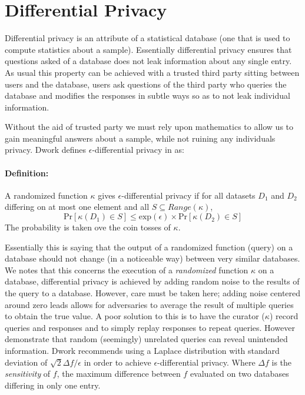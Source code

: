 \section{Differential Privacy}\label{sec:diff}
Differential privacy is an attribute of a statistical database (one that is used
to compute statistics about a sample). Essentially differential privacy ensures
that questions asked of a database does not leak information about any single
entry. As usual this property can be achieved with a trusted third party sitting
between users and the database, users ask questions of the third party who
queries the database and modifies the responses in subtle ways so as to not leak
individual information.

Without the aid of trusted party we must rely upon mathematics to allow us to
gain meaningful answers about a sample, while not ruining any individuals
privacy. Dwork defines $\epsilon$-differential privacy in
\cite{dwork2008differential} as:

\paragraph{Definition:} A randomized function $\kappa$ gives
$\epsilon$-differential privacy if for all datasets $D_1$ and $D_2$ differing on
at most one element and all $S\subseteq Range(\kappa)$,
\[
    \text{Pr}[\kappa(D_1) \in S] \leq \text{exp}(\epsilon) \times 
    \text{Pr}[\kappa(D_2) \in S]
\]
The probability is taken ove the coin tosses of $\kappa$.

Essentially this is saying that the output of a randomized function (query) on a
database should not change (in a noticeable way) between very similar databases.
We notes that this concerns the execution of a \textit{randomized} function
$\kappa$ on a database, differential privacy is achieved by adding random noise
to the results of the query to a database. However, care must be taken here;
adding noise centered around zero leads allows for adversaries to average the
result of multiple queries to obtain the true value. A poor solution to this is
to have the curator ($\kappa$) record queries and responses and to simply replay
responses to repeat queries. However \cite{dinur2003revealing} demonstrate that
random (seemingly) unrelated queries can reveal unintended information. Dwork
recommends using a Laplace distribution with standard deviation of
$\sqrt{2}\Delta f/\epsilon$ in order to achieve $\epsilon$-differential privacy.
Where $\Delta f$ is the \textit{sensitivity} of $f$, the maximum difference
between $f$ evaluated on two databases differing in only one entry.

